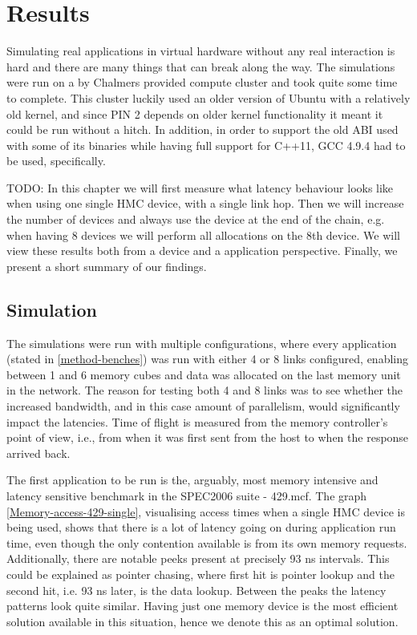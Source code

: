 \chapter{Results}
Simulating real applications in virtual hardware without any real interaction is hard and there are many things that can break along the way. The simulations were run on a by Chalmers provided compute cluster and took quite some time to complete. This cluster luckily used an older version of Ubuntu with a relatively old kernel, and since PIN 2 depends on older kernel functionality it meant it could be run without a hitch. In addition, in order to support the old ABI used with some of its binaries while having full support for C++11, GCC 4.9.4 had to be used, specifically. 
\bigskip

TODO: In this chapter we will first measure what latency behaviour looks like when using one single HMC device, with a single link hop. Then we will increase the number of devices and always use the device at the end of the chain, e.g. when having 8 devices we will perform all allocations on the 8th device. We will view these results both from a device and a application perspective. Finally, we present a short summary of our findings.

\section{Simulation}
The simulations were run with multiple configurations, where every application (stated in \ref{method-benches}) was run with either 4 or 8 links configured, enabling between 1 and 6 memory cubes and data was allocated on the last memory unit in the network. The reason for testing both 4 and 8 links was to see whether the increased bandwidth, and in this case amount of parallelism, would significantly impact the latencies. Time of flight is measured from the memory controller's point of view, i.e., from when it was first sent from the host to when the response arrived back. 
\bigskip

The first application to be run is the, arguably, most memory intensive and latency sensitive benchmark in the SPEC2006 suite - 429.mcf. The graph \ref{Memory-access-429-single}, visualising access times when a single HMC device is being used, shows that there is a lot of latency going on during application run time, even though the only contention available is from its own memory requests. Additionally, there are notable peeks present at precisely 93 ns intervals. This could be explained as pointer chasing, where first hit is pointer lookup and the second hit, i.e. 93 ns later, is the data lookup. Between the peaks the latency patterns look quite similar. Having just one memory device is the most efficient solution available in this situation, hence we denote this as an optimal solution.
\bigskip

